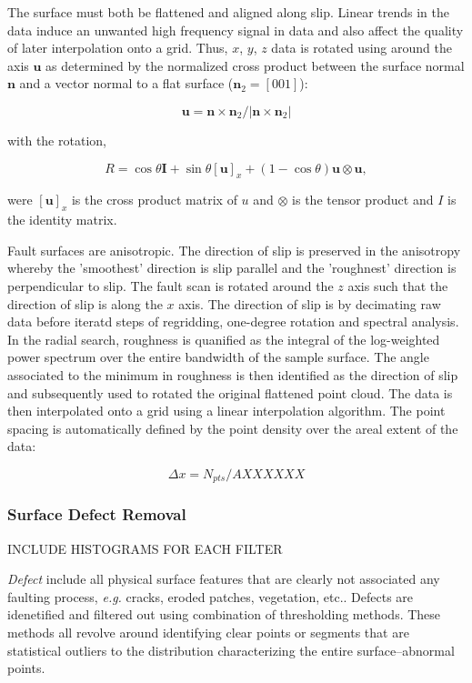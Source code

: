 \documentclass[12pt,a4paper]{article}
\begin{document}

The surface must both be flattened and aligned along slip. Linear trends in the data induce an unwanted high frequency signal in data and also affect the quality of later interpolation onto a grid. Thus, $x$, $y$, $z$ data is rotated using around the axis $\textbf{u}$ as determined by the normalized cross product between the surface normal $\textbf{n}$ and a vector normal to a flat surface ($\textbf{n}_2 = [0 0 1]$): 

$$ \textbf{u} = {\textbf{n}\times\textbf{n}_2}/{|{\textbf{n}\times\textbf{n}_2}|} $$

with the rotation,

$$ R = \cos\theta\textbf{I} + \sin\theta[\textbf{u}]_x+(1-\cos\theta)\textbf{u}\otimes\textbf{u},$$

were $[\textbf{u}]_x$ is the cross product matrix of $u$ and $\otimes$ is the tensor product and $I$ is the identity matrix.

Fault surfaces are anisotropic. The direction of slip is preserved in the anisotropy whereby the 'smoothest' direction is slip parallel and the 'roughnest' direction is perpendicular to slip. The fault scan is rotated around the $z$ axis such that the direction of slip is along the $x$ axis. The direction of slip is by decimating raw data before iteratd steps of regridding, one-degree rotation and spectral analysis. In the radial search, roughness is quanified as the integral of the log-weighted power spectrum over the entire bandwidth of the sample surface. The angle associated to the minimum in roughness is then identified as the direction of slip and subsequently used to rotated the original flattened point cloud. The data is then interpolated onto a grid using a linear interpolation algorithm. The point spacing is automatically defined by the point density over the areal extent of the data:

\begin{equation}
	\Delta x = N_{pts}/A XXXXXX
\end{equation}

		\subsubsection{Surface Defect Removal} 

INCLUDE HISTOGRAMS FOR EACH FILTER


\textit{Defect} include all physical surface features that are clearly not associated any faulting process, \textit{e.g.} cracks, eroded patches, vegetation, etc.. Defects are idenetified and filtered out using combination of thresholding methods. These methods all revolve around identifying clear points or segments that are statistical outliers to the distribution characterizing the entire surface--abnormal points. 
\end{document}
